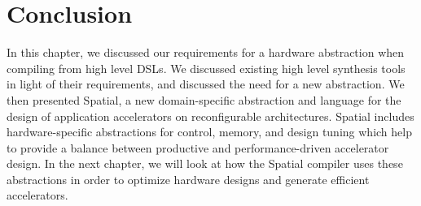 \section{Conclusion}
In this chapter, we discussed our requirements for a hardware abstraction when
compiling from high level DSLs. We discussed existing high level synthesis tools
in light of their requirements, and discussed the need for a new abstraction.
We then presented Spatial, a new domain-specific abstraction and language
for the design of application accelerators on reconfigurable architectures.
Spatial includes hardware-specific abstractions for control, memory,
and design tuning which help to provide a balance
between productive and performance-driven accelerator design.
In the next chapter, we will look at how the Spatial compiler uses these
abstractions in order to optimize hardware designs and generate efficient accelerators.
